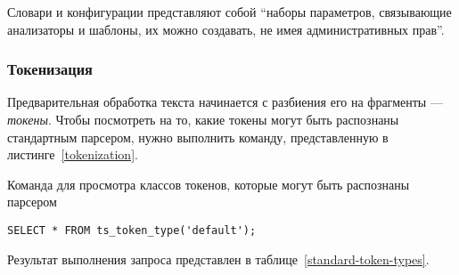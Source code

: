 \noindent Словари и конфигурации представляют собой \enquote{наборы параметров, связывающие анализаторы и шаблоны, их можно создавать, не имея административных прав}.

\subsubsection{Токенизация}

Предварительная обработка текста начинается с разбиения его на фрагменты --- \textit{токены}.
Чтобы посмотреть на то, какие токены могут быть распознаны стандартным парсером, нужно выполнить команду, представленную в листинге~\ref{tokenization}.

\begin{algorithm}
    \caption{Команда для просмотра классов токенов, которые могут быть распознаны парсером}
    \label{tokenization}
    \begin{lstlisting}[style=codelistingstyle]
        SELECT * FROM ts_token_type('default');
    \end{lstlisting}
\end{algorithm}

\noindent Результат выполнения запроса представлен в таблице~\ref{standard-token-types}.

